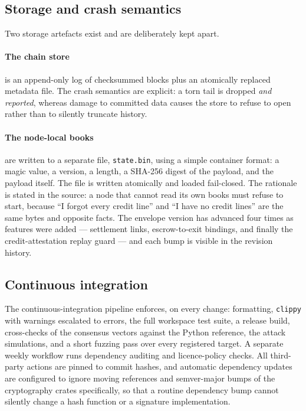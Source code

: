 \documentclass{article}
\begin{document}
\subsection{Storage and crash semantics}

Two storage artefacts exist and are deliberately kept apart.

\paragraph{The chain store} is an append-only log of checksummed blocks plus an
atomically replaced metadata file. The crash semantics are explicit: a torn
tail is dropped \emph{and reported}, whereas damage to committed data causes
the store to refuse to open rather than to silently truncate history.

\paragraph{The node-local books} are written to a separate file,
\texttt{state.bin}, using a simple container format:
a magic value, a version, a length, a SHA-256 digest of the payload, and the
payload itself. The file is written atomically and loaded fail-closed. The
rationale is stated in the source: a node that cannot read its own books must
refuse to start, because ``I forgot every credit line'' and ``I have no credit
lines'' are the same bytes and opposite facts. The envelope version has advanced
four times as features were added --- settlement links, escrow-to-exit
bindings, and finally the credit-attestation replay guard --- and each bump is
visible in the revision history.

\subsection{Continuous integration}

The continuous-integration pipeline enforces, on every change: formatting,
\texttt{clippy} with warnings escalated to errors, the full workspace test suite,
a release build, cross-checks of the consensus vectors against the Python
reference, the attack simulations, and a short fuzzing pass over every
registered target. A separate weekly workflow runs dependency auditing and
licence-policy checks. All third-party actions are pinned to commit hashes, and
automatic dependency updates are configured to ignore moving references and
semver-major bumps of the cryptography crates specifically, so that a routine
dependency bump cannot silently change a hash function or a signature
implementation.
\end{document}
